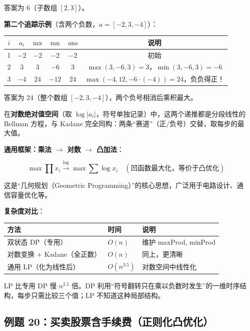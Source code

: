 \documentclass[12pt, a4paper]{ctexart}
\begin{document}
\begin{blackboard}
答案为 6（子数组 $[2,3]$）。

\textbf{第二个追踪示例}（含两个负数，$a = [-2, 3, -4]$）：

\begin{center}
\begin{tabular}{cccccc}
\toprule
$i$ & $a_i$ & $\text{mx}$ & $\text{mn}$ & $\text{ans}$ & 说明 \\
\midrule
1 & $-2$ & $-2$ & $-2$ & $-2$ & 初始 \\
2 & 3   & 3   & $-6$ & 3   & $\max(3,-6,3)=3$，$\min(3,-6,3)=-6$ \\
3 & $-4$ & 24  & $-12$ & 24  & $\max(-4,12,-6{\cdot}(-4))=24$，负负得正！ \\
\bottomrule
\end{tabular}
\end{center}

答案为 24（整个数组 $[-2,3,-4]$），两个负号相消后乘积最大。

在\textbf{对数绝对值空间}（取 $\log|a_i|$，符号单独记录）中，这两个递推都是分段线性的 Bellman 方程，与 Kadane 完全同构：两条``赛道''（正/负号）交替，取每步的最大值。

\textbf{通用框架：乘法 $\to$ 对数 $\to$ 凸加法}：

$$\max \prod x_i \xrightarrow{\log} \max \sum \log x_i \quad (\text{凹函数最大化，等价于凸优化})$$

这是``几何规划（Geometric Programming）''的核心思想，广泛用于电路设计、通信容量优化等。

\textbf{复杂度对比}：

\begin{center}
\begin{tabular}{lll}
\toprule
方法 & 时间 & 说明 \\
\midrule
双状态 DP（专用） & $O(n)$ & 维护 maxProd, minProd \\
对数变换 + Kadane（全正数）& $O(n)$ & 同上，更清晰 \\
通用 LP（化为线性后） & $O(n^{3.5})$ & 对数空间中线性化 \\
\bottomrule
\end{tabular}
\end{center}

LP 比专用 DP 慢 $n^{2.5}$ 倍。DP 利用``符号翻转只在乘以负数时发生''的一维时序结构，每步只需比较三个值；LP 不知道这种局部结构。

\end{blackboard}

\subsection{例题 20：买卖股票含手续费（正则化凸优化）}
\end{document}
